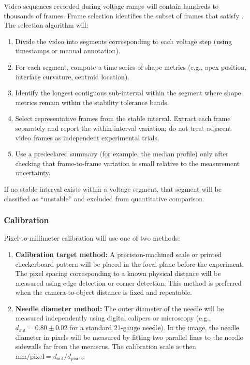 Video sequences recorded during voltage ramps will contain hundreds to thousands of frames. Frame selection identifies the subset of frames that satisfy . The selection algorithm will:
\begin{enumerate}
    \item Divide the video into segments corresponding to each voltage step (using timestamps or manual annotation).
    \item For each segment, compute a time series of shape metrics (e.g., apex position, interface curvature, centroid location).
    \item Identify the longest contiguous sub-interval within the segment where shape metrics remain within the stability tolerance bands.
    \item Select representative frames from the stable interval. Extract each frame separately and report the within-interval variation; do not treat adjacent video frames as independent experimental trials.
    \item Use a predeclared summary (for example, the median profile) only after checking that frame-to-frame variation is small relative to the measurement uncertainty.
\end{enumerate}

If no stable interval exists within a voltage segment, that segment will be classified as ``unstable'' and excluded from quantitative comparison.

\subsubsection{Calibration}

Pixel-to-millimeter calibration will use one of two methods:
\begin{enumerate}
    \item \textbf{Calibration target method:} A precision-machined scale or printed checkerboard pattern will be placed in the focal plane before the experiment. The pixel spacing corresponding to a known physical distance will be measured using edge detection or corner detection. This method is preferred when the camera-to-object distance is fixed and repeatable.
    \item \textbf{Needle diameter method:} The outer diameter of the needle will be measured independently using digital calipers or microscopy (e.g., $d_{\mathrm{out}} = 0.80 \pm 0.02$ for a standard 21-gauge needle). In the image, the needle diameter in pixels will be measured by fitting two parallel lines to the needle sidewalls far from the meniscus. The calibration scale is then $\text{mm/pixel} = d_{\mathrm{out}} / d_{\text{pixels}}$.
\end{enumerate}

